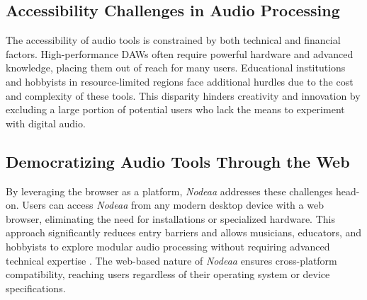 \documentclass[10pt,twocolumn]{article}
\begin{document}
\subsection{Accessibility Challenges in Audio Processing}

The accessibility of audio tools is constrained by both technical and financial factors. High-performance DAWs often require powerful hardware and advanced knowledge, placing them out of reach for many users. Educational institutions and hobbyists in resource-limited regions face additional hurdles due to the cost and complexity of these tools. This disparity hinders creativity and innovation by excluding a large portion of potential users who lack the means to experiment with digital audio.

\subsection{Democratizing Audio Tools Through the Web}

By leveraging the browser as a platform, \textit{Nodeaa} addresses these challenges head-on. Users can access \textit{Nodeaa} from any modern desktop device with a web browser, eliminating the need for installations or specialized hardware. This approach significantly reduces entry barriers and allows musicians, educators, and hobbyists to explore modular audio processing without requiring advanced technical expertise \cite{leyshon2014reformatted}. The web-based nature of \textit{Nodeaa} ensures cross-platform compatibility, reaching users regardless of their operating system or device specifications.
\end{document}

